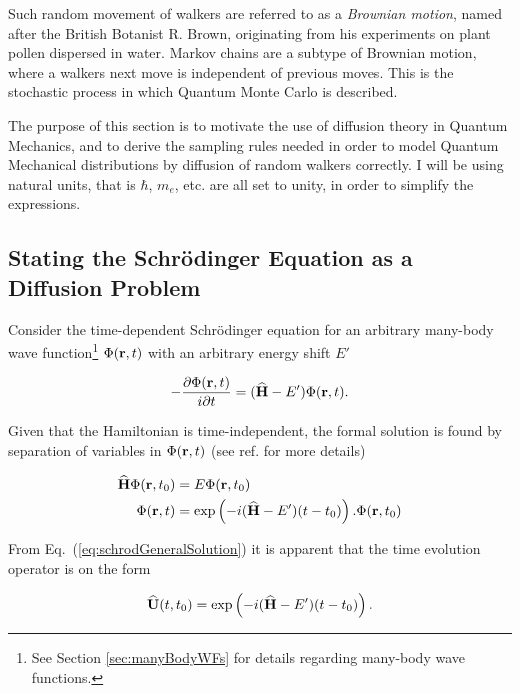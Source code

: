 Such random movement of walkers are referred to as a \textit{Brownian motion}, named after the British Botanist R. Brown, originating from his experiments on plant pollen dispersed in water. Markov chains are a subtype of Brownian motion, where a walkers next move is independent of previous moves. This is the stochastic process in which Quantum Monte Carlo is described.

The purpose of this section is to motivate the use of diffusion theory in Quantum Mechanics, and to derive the sampling rules needed in order to model Quantum Mechanical distributions by diffusion of random walkers correctly. I will be using natural units, that is $\hbar$, $m_e$, etc. are all set to unity, in order to simplify the expressions.

\subsection{Stating the Schrödinger Equation as a Diffusion Problem}
\label{sec:statingDiff}

Consider the time-dependent Schrödinger equation for an arbitrary many-body wave function\footnote{See Section \ref{sec:manyBodyWFs} for details regarding many-body wave functions.} $\Phi(\mathbf{r}, t)$ with an arbitrary energy shift $E'$

\begin{equation}
 -\frac{\partial \Phi(\mathbf{r}, t)}{i\partial t} = ({\bf\widehat{H}} - E')\Phi(\mathbf{r}, t).
\end{equation}

Given that the Hamiltonian is time-independent, the formal solution is found by separation of variables in $\Phi(\mathbf{r}, t)$ (see ref. \cite{griffiths} for more details)

\begin{align}
 {\bf\widehat{H}}\Phi(\mathbf{r}, t_0) &= E\Phi(\mathbf{r}, t_0) \\
 \Phi(\mathbf{r}, t) &= \exp\left(-i({\bf\widehat{H}} - E')(t-t_0)\right).\Phi(\mathbf{r}, t_0) \label{eq:schrodGeneralSolution}
\end{align}

From Eq.~(\ref{eq:schrodGeneralSolution}) it is apparent that the time evolution operator is on the form

\begin{equation}
 {\bf\widehat{U}}(t, t_0) = \exp\left(-i({\bf\widehat{H}} - E')(t-t_0)\right). \label{eq:TimeEvolOp}
\end{equation}

% 

